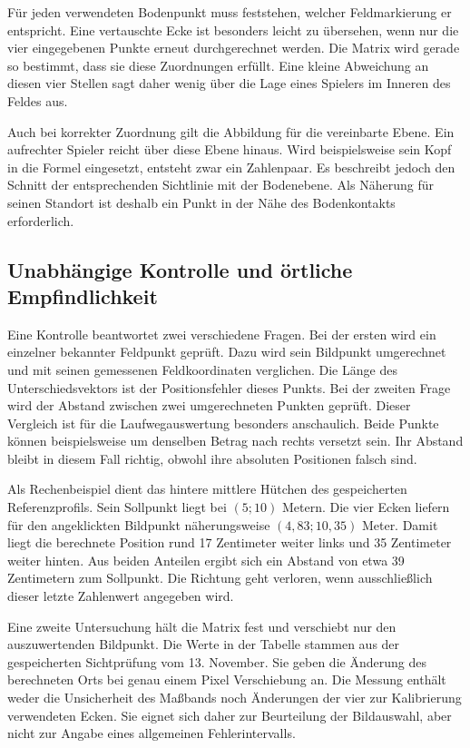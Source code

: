 Für jeden verwendeten Bodenpunkt muss feststehen, welcher Feldmarkierung er entspricht. Eine vertauschte Ecke ist besonders leicht zu übersehen, wenn nur die vier eingegebenen Punkte erneut durchgerechnet werden. Die Matrix wird gerade so bestimmt, dass sie diese Zuordnungen erfüllt. Eine kleine Abweichung an diesen vier Stellen sagt daher wenig über die Lage eines Spielers im Inneren des Feldes aus.

Auch bei korrekter Zuordnung gilt die Abbildung für die vereinbarte Ebene. Ein aufrechter Spieler reicht über diese Ebene hinaus. Wird beispielsweise sein Kopf in die Formel eingesetzt, entsteht zwar ein Zahlenpaar. Es beschreibt jedoch den Schnitt der entsprechenden Sichtlinie mit der Bodenebene. Als Näherung für seinen Standort ist deshalb ein Punkt in der Nähe des Bodenkontakts erforderlich.

\subsection{Unabhängige Kontrolle und örtliche Empfindlichkeit}
Eine Kontrolle beantwortet zwei verschiedene Fragen. Bei der ersten wird ein einzelner bekannter Feldpunkt geprüft. Dazu wird sein Bildpunkt umgerechnet und mit seinen gemessenen Feldkoordinaten verglichen. Die Länge des Unterschiedsvektors ist der Positionsfehler dieses Punkts. Bei der zweiten Frage wird der Abstand zwischen zwei umgerechneten Punkten geprüft. Dieser Vergleich ist für die Laufwegauswertung besonders anschaulich. Beide Punkte können beispielsweise um denselben Betrag nach rechts versetzt sein. Ihr Abstand bleibt in diesem Fall richtig, obwohl ihre absoluten Positionen falsch sind.

Als Rechenbeispiel dient das hintere mittlere Hütchen des gespeicherten Referenzprofils. Sein Sollpunkt liegt bei $(5;10)$ Metern. Die vier Ecken liefern für den angeklickten Bildpunkt näherungsweise $(4{,}83;10{,}35)$ Meter. Damit liegt die berechnete Position rund 17 Zentimeter weiter links und 35 Zentimeter weiter hinten. Aus beiden Anteilen ergibt sich ein Abstand von etwa 39 Zentimetern zum Sollpunkt. Die Richtung geht verloren, wenn ausschließlich dieser letzte Zahlenwert angegeben wird.

Eine zweite Untersuchung hält die Matrix fest und verschiebt nur den auszuwertenden Bildpunkt. Die Werte in der Tabelle stammen aus der gespeicherten Sichtprüfung vom 13. November. Sie geben die Änderung des berechneten Orts bei genau einem Pixel Verschiebung an. Die Messung enthält weder die Unsicherheit des Maßbands noch Änderungen der vier zur Kalibrierung verwendeten Ecken. Sie eignet sich daher zur Beurteilung der Bildauswahl, aber nicht zur Angabe eines allgemeinen Fehlerintervalls.


